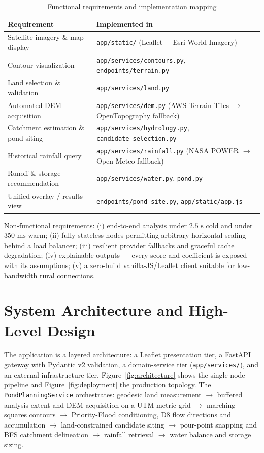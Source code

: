 \documentclass[manuscript,screen,review]{acmart}
\begin{document}
\begin{table}[h]
  \caption{Functional requirements and implementation mapping}
  \label{tab:requirements}
  \begin{tabular}{p{4.6cm}p{9.0cm}}
    \toprule
    Requirement & Implemented in \\
    \midrule
    Satellite imagery \& map display & \texttt{app/static/} (Leaflet + Esri World Imagery) \\
    Contour visualization & \texttt{app/services/contours.py}, \texttt{endpoints/terrain.py} \\
    Land selection \& validation & \texttt{app/services/land.py} \\
    Automated DEM acquisition & \texttt{app/services/dem.py} (AWS Terrain Tiles $\to$ OpenTopography fallback) \\
    Catchment estimation \& pond siting & \texttt{app/services/hydrology.py}, \texttt{candidate\_selection.py} \\
    Historical rainfall query & \texttt{app/services/rainfall.py} (NASA POWER $\to$ Open-Meteo fallback) \\
    Runoff \& storage recommendation & \texttt{app/services/water.py}, \texttt{pond.py} \\
    Unified overlay / results view & \texttt{endpoints/pond\_site.py}, \texttt{app/static/app.js} \\
    \bottomrule
  \end{tabular}
\end{table}

Non-functional requirements: (i) end-to-end analysis under $2.5\text{ s}$ cold and under $350\text{ ms}$ warm; (ii) fully stateless nodes permitting arbitrary horizontal scaling behind a load balancer; (iii) resilient provider fallbacks and graceful cache degradation; (iv) explainable outputs --- every score and coefficient is exposed with its assumptions; (v) a zero-build vanilla-JS/Leaflet client suitable for low-bandwidth rural connections.

\section{System Architecture and High-Level Design}
\label{sec:architecture}
The application is a layered architecture: a Leaflet presentation tier, a FastAPI gateway with Pydantic v2 validation, a domain-service tier (\texttt{app/services/}), and an external-infrastructure tier. Figure~\ref{fig:architecture} shows the single-node pipeline and Figure~\ref{fig:deployment} the production topology. The \texttt{PondPlanningService} orchestrates: geodesic land measurement $\to$ buffered analysis extent and DEM acquisition on a UTM metric grid $\to$ marching-squares contours $\to$ Priority-Flood conditioning, D8 flow directions and accumulation $\to$ land-constrained candidate siting $\to$ pour-point snapping and BFS catchment delineation $\to$ rainfall retrieval $\to$ water balance and storage sizing.
\end{document}
